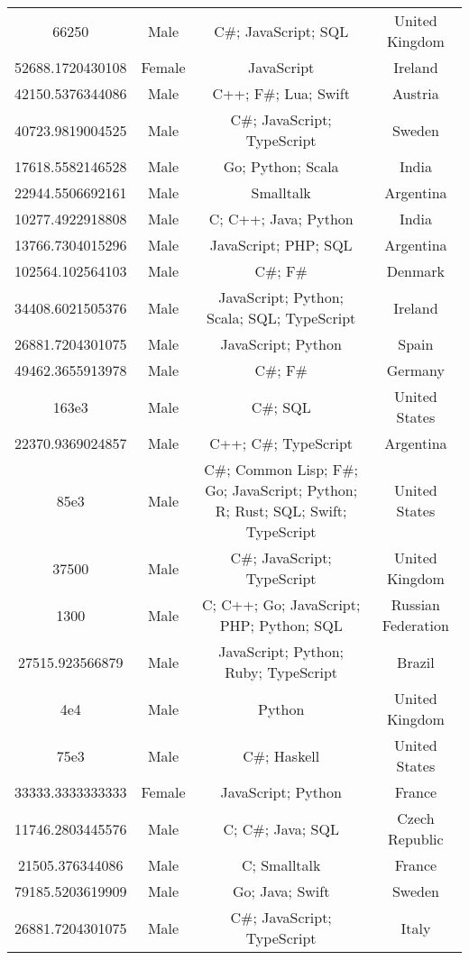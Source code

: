 \begin{center}
\begin{tabular}{ |c|c|c|c| }
66250  &  Male  &  C\#; JavaScript; SQL  &  United Kingdom  \\ 
52688.1720430108  &  Female  &  JavaScript  &  Ireland  \\ 
42150.5376344086  &  Male  &  C++; F\#; Lua; Swift  &  Austria  \\ 
40723.9819004525  &  Male  &  C\#; JavaScript; TypeScript  &  Sweden  \\ 
17618.5582146528  &  Male  &  Go; Python; Scala  &  India  \\ 
22944.5506692161  &  Male  &  Smalltalk  &  Argentina  \\ 
10277.4922918808  &  Male  &  C; C++; Java; Python  &  India  \\ 
13766.7304015296  &  Male  &  JavaScript; PHP; SQL  &  Argentina  \\ 
102564.102564103  &  Male  &  C\#; F\#  &  Denmark  \\ 
34408.6021505376  &  Male  &  JavaScript; Python; Scala; SQL; TypeScript  &  Ireland  \\ 
26881.7204301075  &  Male  &  JavaScript; Python  &  Spain  \\ 
49462.3655913978  &  Male  &  C\#; F\#  &  Germany  \\ 
163e3  &  Male  &  C\#; SQL  &  United States  \\ 
22370.9369024857  &  Male  &  C++; C\#; TypeScript  &  Argentina  \\ 
85e3  &  Male  &  C\#; Common Lisp; F\#; Go; JavaScript; Python; R; Rust; SQL; Swift; TypeScript  &  United States  \\ 
37500  &  Male  &  C\#; JavaScript; TypeScript  &  United Kingdom  \\ 
1300  &  Male  &  C; C++; Go; JavaScript; PHP; Python; SQL  &  Russian Federation  \\ 
27515.923566879  &  Male  &  JavaScript; Python; Ruby; TypeScript  &  Brazil  \\ 
4e4  &  Male  &  Python  &  United Kingdom  \\ 
75e3  &  Male  &  C\#; Haskell  &  United States  \\ 
33333.3333333333  &  Female  &  JavaScript; Python  &  France  \\ 
11746.2803445576  &  Male  &  C; C\#; Java; SQL  &  Czech Republic  \\ 
21505.376344086  &  Male  &  C; Smalltalk  &  France  \\ 
79185.5203619909  &  Male  &  Go; Java; Swift  &  Sweden  \\ 
26881.7204301075  &  Male  &  C\#; JavaScript; TypeScript  &  Italy  \\ 

\end{tabular}
\end{center}
